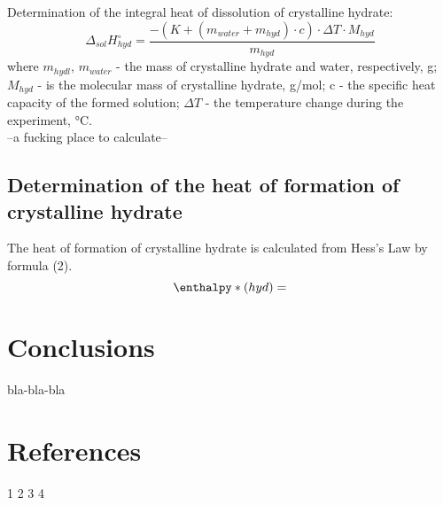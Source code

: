 \documentclass[12pt, letterpaper]{article}
\begin{document}
        Determination of the integral heat of dissolution of crystalline hydrate:
         \begin{equation}
            \Delta_{sol}H^\circ_{hyd} = \frac{-(K + (m_{water} + m_{hyd}) \cdot c) \cdot \Delta T \cdot M_{hyd}}{m_{hyd}}
        \end{equation}
         where $ m_{hydl}$, $m_{water}$ - the mass of crystalline hydrate  and water, respectively, g; $M_{hyd}$ - is the molecular mass of crystalline hydrate, g/mol; c - the specific heat capacity of the formed solution; $\Delta T$ - the temperature change during the experiment, °C. \\

         --a fucking place to calculate--
        
         \subsection*{Determination of the heat of formation of crystalline hydrate}
         \hspace{4mm} The heat of formation of crystalline hydrate is calculated from Hess's Law by formula (2).
         \begin{equation}
            \enthalpy*(hyd){} = 
        \end{equation}

    \section*{Conclusions}
        bla-bla-bla















    
    \newpage

    \section*{References}
        1
        2
        3
        4
\end{document}
